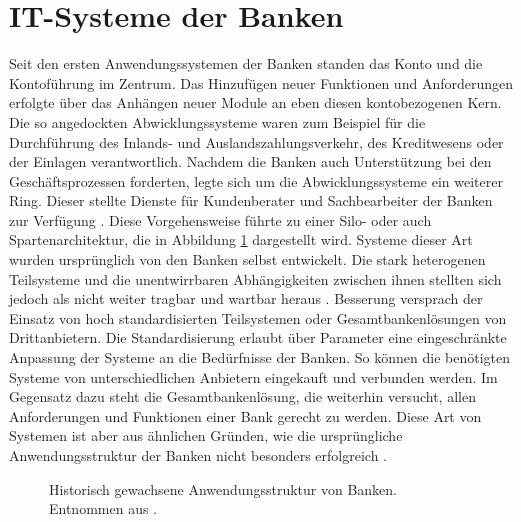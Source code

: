\documentclass[12pt,oneside,a4paper,parskip]{scrbook}
\begin{document}
\section{IT-Systeme der Banken}
Seit den ersten Anwendungssystemen der Banken standen das Konto und die Kontoführung im Zentrum. Das Hinzufügen neuer Funktionen und Anforderungen erfolgte über das Anhängen neuer Module an eben diesen kontobezogenen Kern. Die so angedockten Abwicklungssysteme waren zum Beispiel für die Durchführung des Inlands- und Auslandszahlungsverkehr, des Kreditwesens oder der Einlagen verantwortlich. Nachdem die Banken auch Unterstützung bei den Geschäftsprozessen forderten, legte sich um die Abwicklungssysteme ein weiterer Ring. Dieser stellte Dienste für Kundenberater und Sachbearbeiter der Banken zur Verfügung \cite[18-20]{ITidF}\cite{SuPdIiB}. Diese Vorgehensweise führte zu einer Silo- oder auch Spartenarchitektur, die in Abbildung \ref{zwiebel} dargestellt wird. Systeme dieser Art wurden ursprünglich von den Banken selbst entwickelt. Die stark heterogenen Teilsysteme und die unentwirrbaren Abhängigkeiten zwischen ihnen stellten sich jedoch als nicht weiter tragbar und wartbar heraus \cite{bankEnzy}\cite{SuPdIiB}\cite[52]{ITidF}. Besserung versprach der Einsatz von hoch standardisierten Teilsystemen oder Gesamtbankenlösungen von Drittanbietern. Die Standardisierung erlaubt über Parameter eine eingeschränkte Anpassung der Systeme an die Bedürfnisse der Banken. So können die benötigten Systeme von unterschiedlichen Anbietern eingekauft und verbunden werden. Im Gegensatz dazu steht die Gesamtbankenlösung, die weiterhin versucht, allen Anforderungen und Funktionen einer Bank gerecht zu werden. Diese Art von Systemen ist aber aus ähnlichen Gründen, wie die ursprüngliche Anwendungsstruktur der Banken nicht besonders erfolgreich \cite[S. 56 ff.]{ITidF}. 

\begin{figure}
  \caption[Historische Anwendungsstruktur von Banken]{Historisch gewachsene Anwendungsstruktur von Banken. Entnommen aus \cite{SuPdIiB}.}
  \label{zwiebel}
\end{figure}
\end{document}
